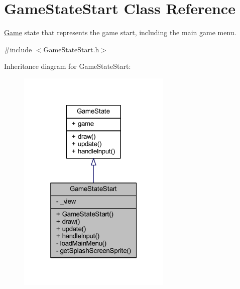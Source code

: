 \hypertarget{class_game_state_start}{\section{Game\+State\+Start Class Reference}
\label{class_game_state_start}
}


\hyperlink{class_game}{Game} state that represents the game start, including the main game menu.  




{\ttfamily \#include $<$Game\+State\+Start.\+h$>$}



Inheritance diagram for Game\+State\+Start\+:
\nopagebreak
\begin{figure}[H]
\begin{center}
\leavevmode
\includegraphics[width=208pt]{class_game_state_start__inherit__graph}
\end{center}
\end{figure}


